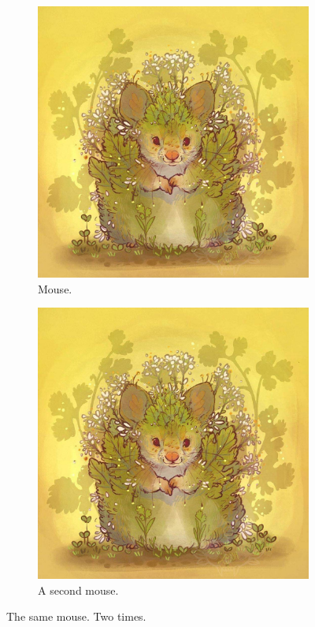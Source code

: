 \documentclass{article}
\begin{document}
\begin{figure}[h!]
  \centering
  \begin{subfigure}[b]{0.4\linewidth}
    \includegraphics[width=\linewidth]{mouse.jpg}
    \caption{Mouse.}
  \end{subfigure}
  \begin{subfigure}[b]{0.4\linewidth}
    \includegraphics[width=\linewidth]{mouse.jpg}
    \caption{A second mouse.}
  \end{subfigure}
  \caption{The same mouse. Two times.}
  \label{fig:mouse}
\end{figure}
\end{document}
